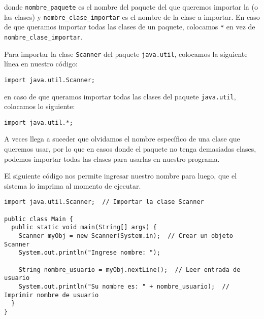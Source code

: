 \documentclass[12pt]{article}
\theoremstyle{largebreak}
\begin{document}
    donde \lstinline|nombre_paquete| es el nombre del paquete del que queremos importar la (o las clases) y \lstinline|nombre_clase_importar| es el nombre de la clase a importar. En caso de que queramos importar todas las clases de un paquete, colocamos \lstinline|*| en vez de \lstinline|nombre_clase_importar|.

    \begin{exa}
        Para importar la clase \lstinline|Scanner| del paquete \lstinline|java.util|, colocamos la siguiente línea en nuestro código:

        \begin{lstlisting}[caption={Importar Clase \lstinline|Scanner|},label=DescriptiveLabel]
import java.util.Scanner;
        \end{lstlisting}

        en caso de que queramos importar todas las clases del paquete \lstinline|java.util|, colocamos lo siguiente:
        \begin{lstlisting}[caption={Importar todas las Clases del Paquete \lstinline|java.util|},label=DescriptiveLabel]
import java.util.*;
        \end{lstlisting}
    \end{exa}

    \begin{obs}
        A veces llega a suceder que olvidamos el nombre específico de una clase que queremos usar, por lo que en casos donde el paquete no tenga demasiadas clases, podemos importar todas las clases para usarlas en nuestro programa.
    \end{obs}

    \begin{exa}
        El siguiente código nos permite ingresar nuestro nombre para luego, que el sistema lo imprima al momento de ejecutar.

        \begin{lstlisting}[caption={Uso Clase \lstinline|Scanner|.},label=DescriptiveLabel]
import java.util.Scanner;  // Importar la clase Scanner

public class Main {
  public static void main(String[] args) {
    Scanner myObj = new Scanner(System.in);  // Crear un objeto Scanner
    System.out.println("Ingrese nombre: ");

    String nombre_usuario = myObj.nextLine();  // Leer entrada de usuario
    System.out.println("Su nombre es: " + nombre_usuario);  // Imprimir nombre de usuario
  }
}
        \end{lstlisting}
    \end{exa}
\end{document}
